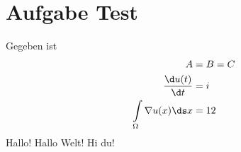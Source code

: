 
\section{Aufgabe Test}
	Gegeben ist
	\begin{align*}
		A&=B=C\\
		\frac{\d u(t)}{\d t}&= i\\
		\int\limits_\Omega\nabla u(x)\ds x&=12
	\end{align*}
	Hallo! 
	\newpage
	Hallo Welt! 
	\newpage
	Hi  du!